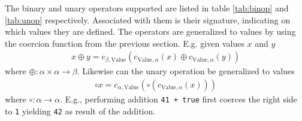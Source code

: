 The binary and unary operators supported are listed in table \ref{tab:binop} and \ref{tab:unop} respectively. Associated with them is their signature, indicating on which values they are defined. The operators are generalized to values by using the coercion function from the previous section. E.g. given values $x$ and $y$
\begin{align*}
    x \oplus y =  c_{\beta, \text{Value}}(c_{\text{Value}, \alpha}(x) \oplus c_{\text{Value},\alpha}(y))
\end{align*}
where $\oplus : \alpha \times \alpha \rightarrow \beta$. Likewise can the unary operation be generalized to values 
\begin{align*}
    \circ x = c_{\alpha, \text{Value}}(\circ (c_{\text{Value}, \alpha}(x)))
\end{align*}
where $\circ : \alpha \rightarrow \alpha $. E.g., performing addition \texttt{41 + true} first coerces the right side to \texttt{1} yielding \texttt{42} as result of the addition. 
\begin{comment}
Notice how the signature of the decrement is different from increment. This follows from the \emph{feature} that decrementing a variable containing \texttt{null} is not coerced to 0 and then decremented, but instead leaves the variable unchanged. This leads to the abstract decrement operation $\texttt{- -}: \text{Value}\rightarrow\text{Value}$.
\begin{align*}
		\texttt{- -} (v_a, v_s, v_n, v_b, v_u) =
		& (\bot, \bot, \notag\\
		&\quad\texttt{- -}(\coerce{Array}{Number}(v_a)\notag\\
		&\quad\quad\sqcup\coerce{String}{Number}(v_s) \notag\\
		&\quad\quad\sqcup v_n \notag\\
		&\quad\quad\sqcup \coerce{Boolean}{Number}(v_b)), \bot, v_u)
\end{align*}
where $\texttt{- -} : \text{Number}\rightarrow\text{Number}$ is defined by table \ref{tab:abs_dec_inl}.

\begin{table}

\centering
\begin{tabular}{l|ccccc}
\texttt{- -} 	& $\bot$ 	& $n$ 	& uInt		& notUInt	&$\top$ \\\hline
			 	& $\bot$ 	& $n-1$	& $\top$	& notUInt	&$\top$	
\end{tabular}
\caption{Abstract pre- and post-decrement\label{tab:abs_dec_inl}}

\end{table}
\end{comment}

